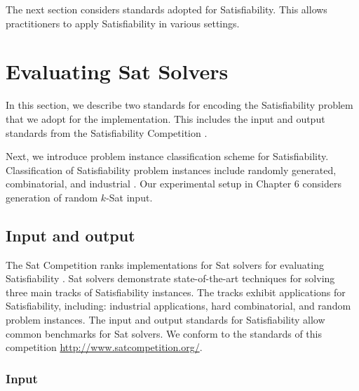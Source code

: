 
The next section considers standards adopted for {\sc Satisfiability}.  This allows practitioners to apply {\sc Satisfiability} in various settings.  
	
\section{Evaluating {\sc Sat} Solvers}

	
	In this section, we describe two standards for encoding the {\sc Satisfiability} problem that we adopt for the implementation.  This includes the input and output standards from the {\sc Satisfiability} Competition \cite{dimacsFormat, satcompetition}.  
	
	Next, we introduce problem instance classification scheme for {\sc Satisfiability}.  Classification of {\sc Satisfiability} problem instances include randomly generated, combinatorial, and industrial \cite{satcompetition}.  Our experimental setup in Chapter 6 considers generation of random $k$-{\sc Sat} input.

	\subsection{Input and output}
	
	
 The {\sc Sat} Competition ranks implementations for {\sc Sat} solvers for evaluating {\sc Satisfiability} \cite{satcompetition}.  {\sc Sat} solvers demonstrate state-of-the-art techniques for solving three main tracks of {\sc Satisfiability} instances.  The tracks exhibit applications for {\sc Satisfiability}, including: industrial applications, hard combinatorial, and random problem instances.  The input and output standards for {\sc Satisfiability} allow common benchmarks for {\sc Sat} solvers.  We conform to the standards of this competition \url{http://www.satcompetition.org/}.  
 

	
		\subsubsection{Input}
		
